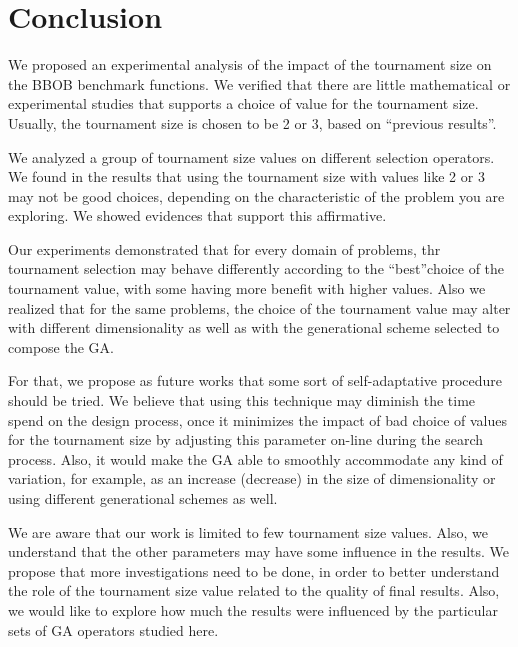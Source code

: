 \section{Conclusion}
\label{sec:conclusion}


We proposed an experimental analysis of the impact of the tournament size on the BBOB benchmark functions. We verified that there are little mathematical or experimental studies that supports a choice of value for the tournament size. Usually, the tournament size is chosen to be 2 or 3, based on ``previous results''. 
 
We analyzed a group of tournament size values on different selection operators. We found in the results that using the tournament size with values like 2 or 3 may not be good choices, depending on the characteristic of the problem you are exploring. We showed evidences that support this affirmative. 

Our experiments demonstrated that for every domain of problems, thr tournament selection may behave differently according to the ``best''choice of the tournament value, with some having more benefit with higher values. Also we realized that for the same problems, the choice of the tournament value may alter with different dimensionality as well as with the generational scheme selected to compose the GA.

For that, we propose as future works that some sort of self-adaptative procedure should be tried. We believe that using this technique may diminish the time spend on the design process, once it minimizes the impact of bad choice of values for the tournament size by adjusting this parameter on-line during the search process. Also, it would make the GA able to smoothly accommodate any kind of variation, for example, as an increase (decrease) in the size of dimensionality or using different generational schemes as well.

We are aware that our work is limited to few tournament size values. Also, we understand that the other parameters may have some influence in the results. We propose that more investigations need to be done, in order to better understand the role of the tournament size value related to the quality of final results. Also, we would like to explore how much the results were influenced by the particular sets of GA operators studied here.


